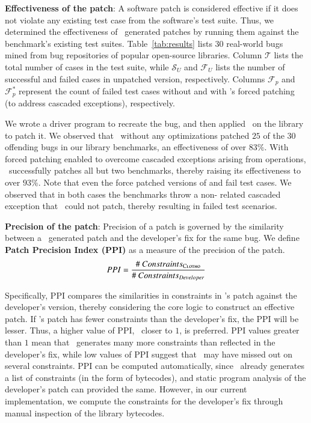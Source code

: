 \begin{mylist}

\item \textbf{Effectiveness of the patch}: A software patch is considered
effective if it does not violate any existing test case from the software's test
suite. Thus, we determined the effectiveness of \tool\ generated patches by
running them against the benchmark's existing test suites.
Table~\ref{tab:results} lists $30$ real-world bugs mined from bug repositories
of popular open-source libraries. Column $\mathcal{T}$ lists the total number
of cases in the test suite, while $\mathcal{S}_{U}$ and $\mathcal{F}_{U}$ lists
the number of successful and failed cases in unpatched version, respectively.
Columns $\mathcal{F}_{p}$ and $\mathcal{F}_{p}^{*}$ represent the count of
failed test cases without and with \tool{}'s forced patching (to address
cascaded exceptions), respectively.

We wrote a driver program to recreate the bug, and then applied \tool\ on the
library to patch it. We observed that \tool\ without any optimizations patched
$25$ of the $30$ offending bugs in our library benchmarks, an effectiveness of
over $83\%$. With forced patching enabled to overcome cascaded exceptions
arising from  operations, \tool\ successfully patches all but two
benchmarks, thereby raising its effectiveness to over $93$\%. Note that even the
force patched versions of  and 
fail test cases. We observed that in both cases the benchmarks throw a
non- related cascaded exception that \tool\ could not patch,
thereby resulting in failed test scenarios.

\item \textbf{Precision of the patch}: Precision of a patch is governed by the
similarity between a \tool\ generated patch and the developer's fix for the same
bug. We define \textbf{Patch Precision Index (PPI)} as a measure of the
precision of the patch.
$$PPI = \frac{\#~Constraints_{\textsc{Clotho}}}{\#~Constraints_{Developer}}$$

Specifically, PPI compares the similarities in constraints in \tool's patch
against the developer's version, thereby considering the core logic to construct
an effective patch. If \tool's patch has fewer constraints than the developer's
fix, the PPI will be lesser. Thus, a higher value of PPI, \ie\ closer to $1$,
is preferred. PPI values greater than $1$ mean that \tool\ generates many more
constraints than reflected in the developer's fix, while low values of PPI
suggest that \tool\ may have missed out on several constraints. PPI can be
computed automatically, since \tool\ already generates a list of constraints (in
the form of bytecodes), and static program analysis of the developer's patch can
provided the same. However, in our current implementation, we compute the
constraints for the developer's fix through manual inspection of the library
bytecodes.


\end{mylist}

